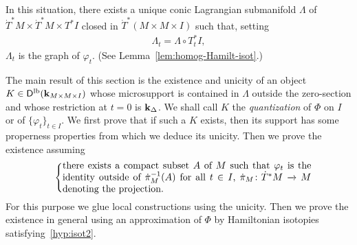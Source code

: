\documentclass[12pt,leqno]{article}
\theoremstyle{definition}
\def\phi{{\varphi}}
\newcommand{\cor}{{\bf k}}
\renewcommand{\to}[1][]{\xrightarrow[]{#1}}
\newcommand{\conv}[1][]{\mathop{\circ}\limits_{#1}}
\newcommand{\opb}[1]{#1^{-1}}
\newcommand{\cl}{\colon}
\newcommand{\eq}{\begin{eqnarray}}
\newcommand{\eneq}{\end{eqnarray}}
\newcommand{\Der}[1][]{\mathsf{D}^{#1}}
\newcommand{\Derlb}{\Der[\mathrm{lb}]}
\newcommand{\dT}{{\dot{T}}}
\newcommand{\dTM}{{\dT}^*M}
\numberwithin{equation}{section}
\begin{document}
In this situation, there exists a unique conic Lagrangian submanifold 
$\Lambda$ of $\dTM\times\dTM\times T^*I$ closed in
$\dT^*(M\times M\times I)$
such that, setting
\eq\label{eq:lambdat}
\Lambda_{t} = \Lambda\conv T^*_{t}I,
\eneq
$\Lambda_t$ is the graph of $\phi_t$. (See Lemma~\ref{lem:homog-Hamilt-isot}.)

The main result of this section is the existence and unicity of an object
$K\in \Derlb(\cor_{M\times M\times I})$ whose microsupport is contained in
$\Lambda$ outside the zero-section and whose restriction at $t=0$ is
$\cor_\Delta$.  We shall call $K$ the {\em quantization} of $\Phi$ on
$I$ or of $\{\phi_t\}_{t\in I}$.  We
first prove that if such a $K$ exists, then its support has some
properness properties from which we deduce its unicity. 
Then we prove the existence assuming 
\eq\label{hyp:isot2}
&&\left\{\parbox{60ex}{there exists  a compact subset  $A$ of $M$ such that
$\phi_t$ is the identity outside of $\opb{\dot\pi_M}(A)$ for all $t\in I$, 
${\dot\pi_M}\cl\dTM\to M$ denoting the projection.}
\right.
\eneq
 For this purpose we glue local constructions using the unicity. Then we
prove the existence
in general using an approximation of $\Phi$ by Hamiltonian isotopies
satisfying~\eqref{hyp:isot2}.
\end{document}
